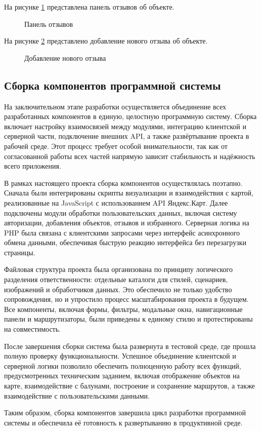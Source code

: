\newpage
На рисунке \ref{r19:image} представлена панель отзывов об объекте.

\begin{figure}[H]
	\center{\texttt{[image: r19]}}
	\caption{Панель отзывов}
	\label{r19:image}
\end{figure}

На рисунке \ref{r20:image} представлено добавление нового отзыва об объекте.

\begin{figure}[H]
	\center{\texttt{[image: r20]}}
	\caption{Добавление нового отзыва}
	\label{r20:image}
\end{figure}

\subsection{Сборка компонентов программной системы}

На заключительном этапе разработки осуществляется объединение всех разработанных компонентов в единую, целостную программную систему. Сборка включает настройку взаимосвязей между модулями, интеграцию клиентской и серверной части, подключение внешних API, а также развёртывание проекта в рабочей среде. Этот процесс требует особой внимательности, так как от согласованной работы всех частей напрямую зависит стабильность и надёжность всего приложения\cite{b29}.

В рамках настоящего проекта сборка компонентов осуществлялась поэтапно. Сначала были интегрированы скрипты визуализации и взаимодействия с картой, реализованные на JavaScript с использованием API Яндекс.Карт. Далее подключены модули обработки пользовательских данных, включая систему авторизации, добавления объектов, отзывов и избранного. Серверная логика на PHP была связана с клиентскими запросами через интерфейс асинхронного обмена данными, обеспечивая быструю реакцию интерфейса без перезагрузки страницы.

Файловая структура проекта была организована по принципу логического разделения ответственности: отдельные каталоги для стилей, сценариев, изображений и обработчиков данных. Это обеспечило не только удобство сопровождения, но и упростило процесс масштабирования проекта в будущем. Все компоненты, включая формы, фильтры, модальные окна, навигационные панели и маршрутизаторы, были приведены к единому стилю и протестированы на совместимость.

После завершения сборки система была развернута в тестовой среде, где прошла полную проверку функциональности. Успешное объединение клиентской и серверной логики позволило обеспечить полноценную работу всех функций, предусмотренных техническим заданием, включая отображение объектов на карте, взаимодействие с балунами, построение и сохранение маршрутов\cite{b30}, а также взаимодействие с пользовательскими данными.

Таким образом, сборка компонентов завершила цикл разработки программной системы и обеспечила её готовность к развертыванию в продуктивной среде.
